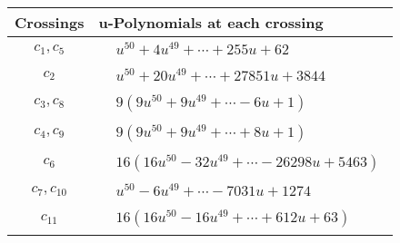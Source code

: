 \documentclass[1p]{elsarticle_modified}
\theoremstyle{definition}
\begin{document}
\begin{tabular}{m{50pt}|m{274pt}}
Crossings & \hspace{64pt}u-Polynomials at each crossing \\
\hline $$\begin{aligned}c_{1},c_{5}\end{aligned}$$&$\begin{aligned}
&u^{50}+4 u^{49}+\cdots+255 u+62
\end{aligned}$\\
\hline $$\begin{aligned}c_{2}\end{aligned}$$&$\begin{aligned}
&u^{50}+20 u^{49}+\cdots+27851 u+3844
\end{aligned}$\\
\hline $$\begin{aligned}c_{3},c_{8}\end{aligned}$$&$\begin{aligned}
&9(9 u^{50}+9 u^{49}+\cdots-6 u+1)
\end{aligned}$\\
\hline $$\begin{aligned}c_{4},c_{9}\end{aligned}$$&$\begin{aligned}
&9(9 u^{50}+9 u^{49}+\cdots+8 u+1)
\end{aligned}$\\
\hline $$\begin{aligned}c_{6}\end{aligned}$$&$\begin{aligned}
&16(16 u^{50}-32 u^{49}+\cdots-26298 u+5463)
\end{aligned}$\\
\hline $$\begin{aligned}c_{7},c_{10}\end{aligned}$$&$\begin{aligned}
&u^{50}-6 u^{49}+\cdots-7031 u+1274
\end{aligned}$\\
\hline $$\begin{aligned}c_{11}\end{aligned}$$&$\begin{aligned}
&16(16 u^{50}-16 u^{49}+\cdots+612 u+63)
\end{aligned}$\\
\hline
\end{tabular}\\~\\
\end{document}
